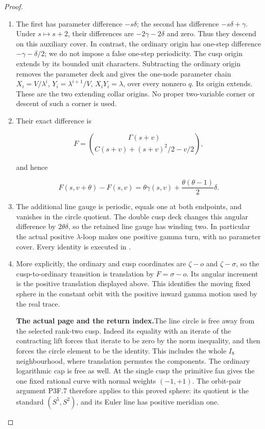 \begin{proof}
\begin{enumerate}[label=\arabic*.]
\[
 o=\binom{-\Gamma s}{-Cs-s^2/2-sv},\qquad
 \sigma=\binom{\Gamma v}{Cv+(v^2-v)/2}.
\]

\item The first has parameter difference \(-s\delta\); the second
has difference \(-s\delta+\gamma\).  Under \(s\mapsto s+2\),
their differences are \(-2\gamma-2\delta\) and zero.  Thus
they descend on this auxiliary cover.  In contrast, the ordinary
origin has one-step difference \(-\gamma-\delta/2\); we do
not impose a false one-step periodicity.  The cusp origin extends
by its bounded unit characters.  Subtracting the ordinary origin
removes the parameter deck and gives the one-node parameter chain
\(X_i=V/\lambda^i\), \(Y_i=\lambda^{i+1}/V\),
\(X_iY_i=\lambda\), over every nonzero \(q\).  Its origin
extends.  These are the two extending collar origins.  No proper
two-variable corner or descent of such a corner is used.

\item Their exact difference is

\[
 F=\binom{\Gamma(s+v)}{C(s+v)+(s+v)^2/2-v/2},
\]

and hence

\[
 F(s,v+\theta)-F(s,v)
 =\theta\gamma(s,v)+\frac{\theta(\theta-1)}2\delta.
\]

\item The additional line gauge is periodic, equals one at both
endpoints, and vanishes in the circle quotient.  The double cusp
deck changes this angular difference by \(2\theta\delta\),
so the retained line gauge has winding two.  In particular the
actual positive \(\lambda\)-loop makes one positive gamma turn,
with no parameter cover.  Every identity is executed in
.

\item More explicitly, the ordinary and cusp coordinates are
\(\zeta-o\) and \(\zeta-\sigma\), so the cusp-to-ordinary
transition is translation by \(F=\sigma-o\). Its angular
increment is the positive translation displayed above. This
identifies the moving fixed sphere in the constant orbit with
the positive inward gamma motion used by the real trace.

\par\medskip\noindent\textbf{The actual page and the return index.}\enspace The line circle is
free away from the selected rank-two cusp.  Indeed its equality
with an iterate of the contracting lift forces that iterate to
be zero by the norm inequality, and then forces the circle
element to be the identity.  This includes the whole \(I_8\)
neighbourhood, where translation permutes the components.  The
ordinary logarithmic cap is free as well.  At the single cusp
the primitive fan gives the one fixed rational curve with normal
weights \((-1,+1)\).  The orbit-pair argument P3F.7 therefore
applies to this proved sphere: its quotient is the standard
\((S^5,S^2)\), and its Euler line has positive meridian one.


\end{enumerate}
\end{proof}
